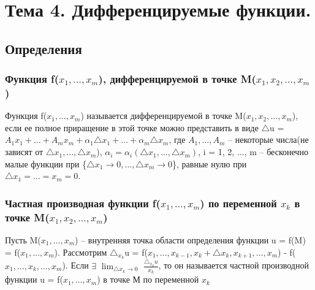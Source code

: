 \documentclass[a4paper, 12pt]{article}
\def\newline{}%
\begin{document}
    \section{Тема 4. Дифференцируемые функции.}
        \subsection{Определения}
            \subsubsection{Функция f(\texorpdfstring{$x_1, \ldots, x_m$}{Lg}), дифференцируемой в точке M(\texorpdfstring{$x_1, x_2, \ldots, x_m$}{Lg})}

            Функция f($x_1, \ldots, x_m$) называется дифференцируемой в точке
            M($x_1, x_2, \ldots, x_m$), если ее полное приращение в этой точке
            можно представить в виде\newline
            $\triangle$u = $A_1x_1 + \ldots + A_mx_m + {\alpha}_1\triangle x_1 + 
            \ldots + {\alpha}_m\triangle x_m$, где $A_1, \ldots, A_m$ -- некоторые
            числа(не зависят от $\triangle x_1, \ldots, \triangle x_m$), ${\alpha}_i 
            = {\alpha}_i(\triangle x_1, \ldots, \triangle x_m)$, i = 1, 2, $\ldots$,
            m -- бесконечно малые функции при \{$\triangle x_1 \rightarrow 0,
            \ldots, \triangle x_m \rightarrow 0$\}, равные нулю при $\triangle x_1 = \ldots
            = x_m = 0$.


            \subsubsection{Частная производная функции f(\texorpdfstring{$x_1, \ldots, x_m$}{Lg}) по переменной
            \texorpdfstring{$x_k$}{Lg} в точке M(\texorpdfstring{$x_1, x_2, \ldots, x_m$}{Lg})}

            Пусть M($x_1, \ldots, x_m$) -- внутренняя точка области определения функции
            u = f(M) = f($x_1, \ldots, x_m$). Рассмотрим ${\triangle}_{x_k}$u
            = f($x_1, \ldots, x_{k-1}, x_k + \triangle x_k, x_{k+1}, \ldots, x_m$) -\newline
            f($x_1, \ldots, x_k, \ldots, x_m$).\newline
            Если $\exists$ $\displaystyle{\lim_{\triangle x_k \rightarrow 0}}$ 
            $\frac{{\triangle}_{x_k}u}{x_k}$, то он называется частной производной
            функции u = f($x_1, \ldots, x_m$) в точке М по переменной $x_k$
\end{document}
